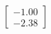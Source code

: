 \documentclass[preview]{standalone}
\begin{document}
\begin{align*}
\begin{bmatrix} -1.00 \\ -2.38 \end{bmatrix}
\end{align*}
\end{document}
